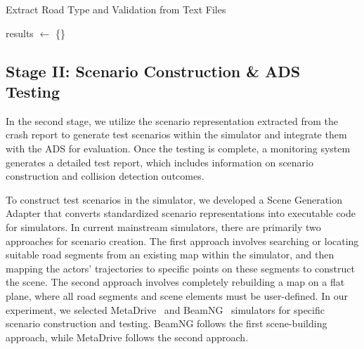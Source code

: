 \begin{algorithm}
\caption{Extract Road Type and Validation from Text Files}

results $\gets$ \{\} 

 
\label{alg:encoder}
\end{algorithm}




\subsection{Stage II: Scenario Construction \& ADS Testing}
\label{sec:Stage-II}
In the second stage, we utilize the scenario representation extracted from the crash report to generate test scenarios within the simulator and integrate them with the ADS for evaluation. Once the testing is complete, a monitoring system generates a detailed test report, which includes information on scenario construction and collision detection outcomes.

To construct test scenarios in the simulator, we developed a Scene Generation Adapter that converts standardized scenario representations into executable code for simulators. In current mainstream simulators, there are primarily two approaches for scenario creation. The first approach involves searching or locating suitable road segments from an existing map within the simulator, and then mapping the actors' trajectories to specific points on these segments to construct the scene. The second approach involves completely rebuilding a map on a flat plane, where all road segments and scene elements must be user-defined. In our experiment, we selected MetaDrive~\cite{li2022metadrive} and BeamNG~\cite{BeamNG} simulators for specific scenario construction and testing. BeamNG follows the first scene-building approach, while MetaDrive follows the second approach. 

